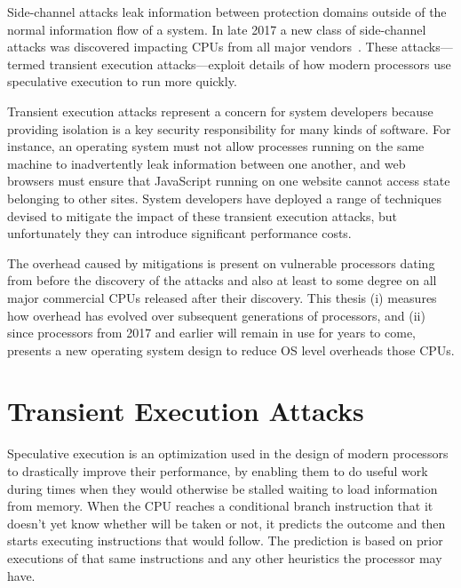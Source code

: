 \noindent
Side-channel attacks leak information between protection domains outside of the normal information flow of a system.
In late 2017 a new class of side-channel attacks was discovered impacting CPUs from all major vendors~\cite{lipp:meltdown, kocher:spectre}.
These attacks---termed transient execution attacks---exploit details of how modern processors use speculative execution to run more quickly. 

Transient execution attacks represent a concern for system developers because providing isolation is a key security responsibility for many kinds of software.
For instance, an operating system must not allow processes running on the same machine to inadvertently leak information between one another, and web browsers must ensure that JavaScript running on one website cannot access state belonging to other sites.
System developers have deployed a range of techniques devised to mitigate the impact of these transient execution attacks, but unfortunately they can introduce significant performance costs.

The overhead caused by mitigations is present on vulnerable processors dating from before the discovery of the attacks and also at least to some degree on all major commercial CPUs released after their discovery.
This thesis (i) measures how overhead has evolved over subsequent generations of processors, and (ii) since processors from 2017 and earlier will remain in use for years to come, presents a new operating system design to reduce OS level overheads those CPUs.



\section{Transient Execution Attacks}
Speculative execution is an optimization used in the design of modern processors to drastically improve their performance, by enabling them to do useful work during times when they would otherwise be stalled waiting to load information from memory.
When the CPU reaches a conditional branch instruction that it doesn't yet know whether will be taken or not, it predicts the outcome and then starts executing instructions that would follow.
The prediction is based on prior executions of that same instructions and any other heuristics the processor may have.


